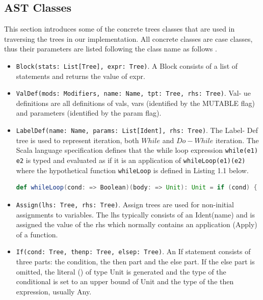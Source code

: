 \subsection{AST Classes}
This section introduces some of the concrete trees classes that are used in traversing the trees in our implementation. All concrete classes are case classes, thus their parameters are listed following the class name as follows \cite{stocker2010scala}. 
\begin{itemize}
\item \texttt{Block(stats: List[Tree], expr: Tree)}. A Block consists of a list of statements and returns the value of expr.
\item \texttt{ValDef(mods: Modifiers, name: Name, tpt: Tree, rhs: Tree)}. Val- ue definitions are all definitions of vals, vars (identified by the MUTABLE flag) and parameters (identified by the param flag).
\item \texttt{LabelDef(name: Name, params: List[Ident], rhs: Tree)}. The Label- Def tree is used to represent iteration, both $While$ and $Do-While$ iteration. The Scala language specification \cite{odersky2004scala} defines that the while loop expression \texttt{while(e1) e2} is typed and evaluated as if it is an application of \texttt{whileLoop(e1)(e2)} where the hypothetical function \texttt{whileLoop} is defined in Listing 1.1 below. 
\begin{lstlisting}[language=scala,caption=WhileLoop Function, label = whileloop]
def whileLoop(cond: => Boolean)(body: => Unit): Unit = if (cond) { body ; whileLoop(cond)(body) } else {}
\end{lstlisting}
\item \texttt{Assign(lhs: Tree, rhs: Tree)}. Assign trees are used for non-initial assignments to variables. The lhs typically consists of an Ident(name) and is assigned the value of the rhs which normally contains an application (Apply) of a function. 
\item \texttt{If(cond: Tree, thenp: Tree, elsep: Tree)}. An If statement consists of three parts: the condition, the then part and the else part. If the else part is omitted, the literal () of type Unit is generated and the type of the conditional is set to an upper bound of Unit and the type of the then expression, usually Any.
\end{itemize}

